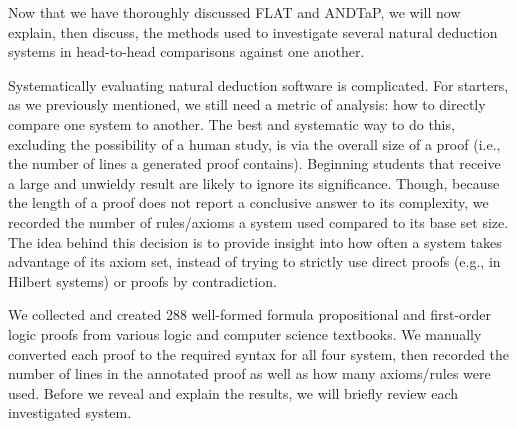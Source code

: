 \documentclass[ms]{uncgdissertationexp2}
\theoremstyle{plain}
\theoremstyle{definition}
\theoremstyle{remark}
\begin{document}
Now that we have thoroughly discussed FLAT and ANDTaP, we will now explain, then discuss, the methods used to investigate several natural deduction systems in head-to-head comparisons against one another.

Systematically evaluating natural deduction software is complicated. For starters, as we previously mentioned, we still need a metric of analysis: how to directly compare one system to another. The best and systematic way to do this, excluding the possibility of a human study, is via the overall size of a proof (i.e., the number of lines a generated proof contains). Beginning students that receive a large and unwieldy result are likely to ignore its significance. Though, because the length of a proof does not report a conclusive answer to its complexity, we recorded the number of rules/axioms a system used compared to its base set size. The idea behind this decision is to provide insight into how often a system takes advantage of its axiom set, instead of trying to strictly use direct proofs (e.g., in Hilbert systems) or proofs by contradiction. 

We collected and created 288 well-formed formula propositional and first-order logic proofs from various logic and computer science textbooks. We manually converted each proof to the required syntax for all four system, then recorded the number of lines in the annotated proof as well as how many axioms/rules were used. Before we reveal and explain the results, we will briefly review each investigated system.
\end{document}
